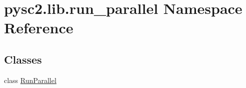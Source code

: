 \hypertarget{namespacepysc2_1_1lib_1_1run__parallel}{}\section{pysc2.\+lib.\+run\+\_\+parallel Namespace Reference}
\label{namespacepysc2_1_1lib_1_1run__parallel}
\subsection*{Classes}
\begin{DoxyCompactItemize}
\item 
class \mbox{\hyperlink{classpysc2_1_1lib_1_1run__parallel_1_1_run_parallel}{Run\+Parallel}}
\end{DoxyCompactItemize}
